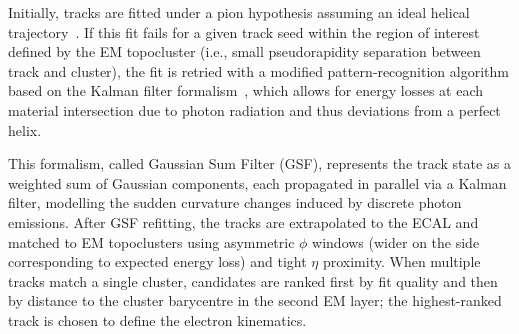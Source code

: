 Initially, tracks are fitted under a pion hypothesis assuming an ideal helical trajectory~\cite{tracks}. If this fit fails for a given track seed within the region of interest defined by the EM topocluster (i.e., small pseudorapidity separation between track and cluster), the fit is retried with a modified pattern‐recognition algorithm based on the Kalman filter formalism~\cite{FRUHWIRTH1987444}, which allows for energy losses at each material intersection due to photon radiation and thus deviations from a perfect helix.

This formalism, called Gaussian Sum Filter (GSF), represents the track state as a weighted sum of Gaussian components, each propagated in parallel via a Kalman filter, modelling the sudden curvature changes induced by discrete photon emissions. After GSF refitting, the tracks are extrapolated to the ECAL and matched to EM topoclusters using asymmetric $\phi$ windows (wider on the side corresponding to expected energy loss) and tight $\eta$ proximity. When multiple tracks match a single cluster, candidates are ranked first by fit quality and then by distance to the cluster barycentre in the second EM layer; the highest-ranked track is chosen to define the electron kinematics.


